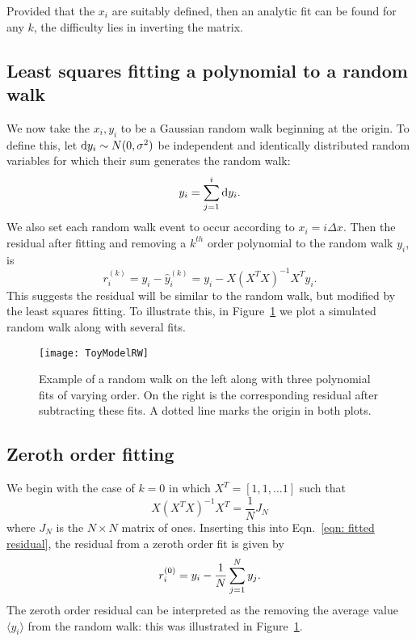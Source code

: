 \documentclass[../full_thesis/full_thesis.tex]{subfiles}
\begin{document}
\begin{subappendices}
Provided that the $x_{i}$ are suitably defined, then an analytic fit can be
found for any $k$, the difficulty lies in inverting the matrix.

\subsection{Least squares fitting a polynomial to a random walk} We now take
the $x_i, y_i$ to be a Gaussian random walk beginning at the origin. To define
this, let $\mathrm{d} y_{i} \sim N(0, \sigma^{2})$ be independent and identically
distributed random variables for which their sum generates the random walk:
\begin{equation}
y_{i} = \sum_{j=1}^{i}\mathrm{d} y_{i}.
\label{eqn: ToyModel RW definition}
\end{equation}
We also set each random walk event to occur according to $x_{i} = i \Delta x$.
Then the residual after fitting and removing a $k^{th}$ order polynomial to the
random walk $y_i$, is
\begin{equation}
r_i^{(k)} = y_{i} - \hat{y}_{i}^{(k)} = y_{i} - X \left(X^{T}X\right)^{-1} X^{T} y_{i}.
\label{eqn: fitted residual}
\end{equation}
This suggests the residual will be similar to the random walk, but modified by
the least squares fitting.  To illustrate this, in Figure~\ref{fig: ToyModelRW}
we plot a simulated random walk along with several fits.
\begin{figure}[htb]
\centering
\texttt{[image: ToyModelRW]}
\caption{Example of a random walk on the left along with three polynomial fits
of varying order. On the right is the corresponding residual after subtracting
these fits. A dotted line marks the origin in both plots.}
\label{fig: ToyModelRW}
\end{figure}

\subsection{Zeroth order fitting}

We begin with the case of $k=0$ in which $X^{T} = [1, 1, \dots 1]$ such
that
\begin{equation}
X \left(X^{T}X\right)^{-1} X^{T} = \frac{1}{N} J_{N}
\end{equation}
where $J_{N}$ is the $N\times N$ matrix of ones.  Inserting this into
Eqn.~\eqref{eqn: fitted residual}, the residual from a zeroth order fit is
given by
\begin{equation}
r_i^{(0)}= y_{i} - \frac{1}{N} \sum_{j=1}^{N}y_{j}.
\end{equation}
The zeroth order residual can be interpreted as the removing the
average value $\langle y_i \rangle$ from the random walk: this was illustrated
in Figure~\ref{fig: ToyModelRW}.


\end{subappendices}
\end{document}
